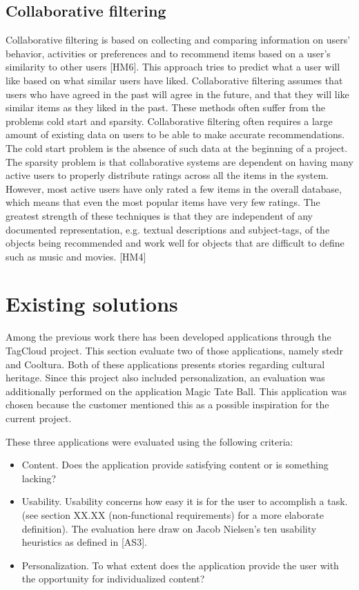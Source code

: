 \subsection{Collaborative filtering}

Collaborative filtering is based on collecting and comparing information on users’ behavior, activities or preferences and to recommend items based on a user’s similarity to other users [HM6]. This approach tries to predict what a user will like based on what similar users have liked. Collaborative filtering assumes that users who have agreed in the past will agree in the future, and that they will like similar items as they liked in the past. These methods often suffer from the problems cold start and sparsity. Collaborative filtering often requires a large amount of existing data on users to be able to make accurate recommendations. The cold start problem is the absence of such data at the beginning of a project. The sparsity problem is that collaborative systems are dependent on having many active users to properly distribute ratings across all the items in the system. However, most active users have only rated a few items in the overall database, which means that even the most popular items have very few ratings. The greatest strength of these techniques is that they are independent of any documented representation, e.g. textual descriptions and subject-tags, of the objects being recommended and work well for objects that are difficult to define such as music and movies. [HM4]

\section{Existing solutions}

Among the previous work there has been developed applications through the TagCloud project. This section evaluate two of those applications, namely stedr and Cooltura. Both of these applications presents stories regarding cultural heritage. Since this project also included personalization, an evaluation was additionally performed on the application Magic Tate Ball. This application was chosen because the customer mentioned this as a possible inspiration for the current project. \newline

These three applications were evaluated using the following criteria:
\begin{itemize}
\item Content. Does the application provide satisfying content or is something lacking?
\item Usability. Usability concerns how easy it is for the user to accomplish a task. (see section XX.XX (non-functional requirements) for a more elaborate definition). The evaluation here draw on Jacob Nielsen’s ten usability heuristics as defined in [AS3].  
\item Personalization. To what extent does the application provide the user with the opportunity for individualized content?
\end{itemize}

